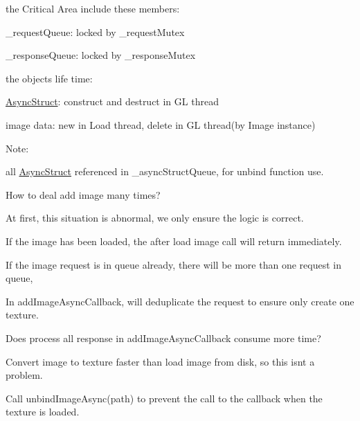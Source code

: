 the Critical Area include these members\+:
\begin{DoxyItemize}
\item \+\_\+request\+Queue\+: locked by \+\_\+request\+Mutex
\item \+\_\+response\+Queue\+: locked by \+\_\+response\+Mutex
\end{DoxyItemize}

the object\textquotesingle{}s life time\+:
\begin{DoxyItemize}
\item \hyperlink{structTextureCache_1_1AsyncStruct}{Async\+Struct}\+: construct and destruct in GL thread
\item image data\+: new in Load thread, delete in GL thread(by Image instance)
\end{DoxyItemize}

Note\+:
\begin{DoxyItemize}
\item all \hyperlink{structTextureCache_1_1AsyncStruct}{Async\+Struct} referenced in \+\_\+async\+Struct\+Queue, for unbind function use.
\end{DoxyItemize}

How to deal add image many times?
\begin{DoxyItemize}
\item At first, this situation is abnormal, we only ensure the logic is correct.
\item If the image has been loaded, the after load image call will return immediately.
\item If the image request is in queue already, there will be more than one request in queue,
\item In add\+Image\+Async\+Callback, will deduplicate the request to ensure only create one texture.
\end{DoxyItemize}

Does process all response in add\+Image\+Async\+Callback consume more time?
\begin{DoxyItemize}
\item Convert image to texture faster than load image from disk, so this isn\textquotesingle{}t a problem.
\end{DoxyItemize}

Call unbind\+Image\+Async(path) to prevent the call to the callback when the texture is loaded. \mbox{\label{classTextureCache_ac97620a31dc4c03c26d0206b6e834ff2}} 
